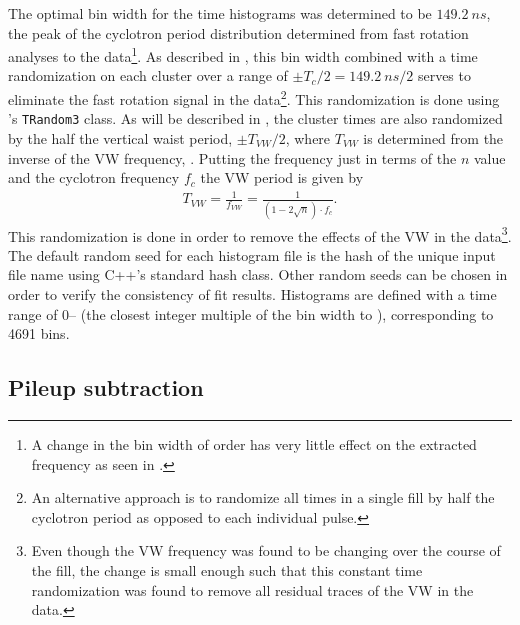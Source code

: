 The optimal bin width for the time histograms was determined to be $\SI{149.2}{ns}$, the peak of the cyclotron period distribution determined from fast rotation analyses to the data\footnote{A change in the bin width of order  has very little effect on the extracted \wa frequency as seen in .}. As described in , this bin width combined with a time randomization on each cluster over a range of $\pm T_{c}/2 = \SI{149.2}{ns} / 2$ serves to eliminate the fast rotation signal in the data\footnote{An alternative approach is to randomize all times in a single fill by half the cyclotron period as opposed to each individual pulse.}. This randomization is done using \ROOT's \texttt{TRandom3} class. As will be described in , the cluster times are also randomized by the half the vertical waist period, $\pm T_{VW}/2$, where $T_{VW}$ is determined from the inverse of the VW frequency, . Putting the frequency just in terms of the $n$ value and the cyclotron frequency $f_{c}$ the VW period is given by
    \begin{align}
        T_{VW} = \frac{1}{f_{VW}} = \frac{1}{(1-2\sqrt{n}) \cdot f_{c}}.
    \end{align}
This randomization is done in order to remove the effects of the VW in the data\footnote{Even though the VW frequency was found to be changing over the course of the fill, the change is small enough such that this constant time randomization was found to remove all residual traces of the VW in the data.}. The default random seed for each histogram \ROOT file is the hash of the unique input file name using C++'s standard hash class. Other random seeds can be chosen in order to verify the consistency of fit results. Histograms are defined with a time range of 0-- (the closest integer multiple of the bin width to ), corresponding to 4691 bins. 




\subsection{Pileup subtraction}
\label{sub:pileupsubtraction}



